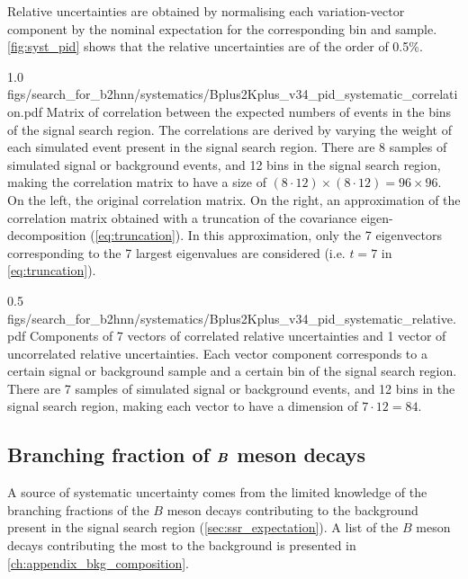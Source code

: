 Relative \PID uncertainties are obtained by normalising each variation-vector component by the nominal expectation for the corresponding bin and sample.
\cref{fig:syst_pid} shows that the relative \PID uncertainties are of the order of 0.5\%.

{1.0}
{figs/search_for_b2hnn/systematics/Bplus2Kplus_v34_pid_systematic_correlation.pdf}
{Matrix of correlation between the expected numbers of events in the bins of the signal search region.
The correlations are derived by varying the \PID weight of each simulated event present in the signal search region.
There are 8 samples of simulated signal or background events, and 12 bins in the signal search region, making the correlation matrix to have a size of $(8\cdot12)\times(8\cdot12)=96\times96$.
On the left, the original correlation matrix.
On the right, an approximation of the correlation matrix obtained with a truncation of the covariance eigen-decomposition (\cref{eq:truncation}).
In this approximation, only the 7 eigenvectors corresponding to the 7 largest eigenvalues are considered (i.e. $t=7$ in \cref{eq:truncation}).
\ssrtext
}

{0.5}
{figs/search_for_b2hnn/systematics/Bplus2Kplus_v34_pid_systematic_relative.pdf}
{
Components of 7 vectors of correlated relative \PID uncertainties and 1 vector of uncorrelated relative \PID uncertainties.
Each vector component corresponds to a certain signal or background sample and a certain bin of the signal search region.
There are 7 samples of simulated signal or background events, and 12 bins in the signal search region, making each vector to have a dimension of $7\cdot12=84$.
\ssrtext
}
\subsection[Branching fraction of \B meson decays]{Branching fraction of $\boldsymbol{B}$ meson decays} \label{sec:syst_br}
A source of systematic uncertainty comes from the limited knowledge of the branching fractions of the $B$ meson decays contributing to the background present in the signal search region (\cref{sec:ssr_expectation}).
A list of the $B$ meson decays contributing the most to the background is presented in \cref{ch:appendix_bkg_composition}. 

